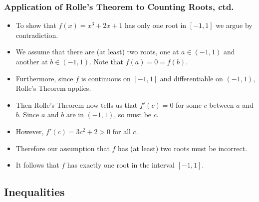 \documentclass[serif,ignorenonframetext]{beamer}
\begin{document}
\begin{frame}
  \frametitle{Application of Rolle's Theorem to Counting Roots, ctd.}
  \begin{itemize}[<+->]
  \item To show that $f(x)=x^3+2x+1$ has only one root in $[-1,1]$
    we argue by contradiction.
  \item We assume that there are (at least) two roots, one at $a\in(-1,1)$ 
    and another at $b\in(-1,1)$.  Note that $f(a)=0=f(b)$.
  \item Furthermore, since $f$ is continuous on $[-1,1]$ and 
    differentiable on $(-1,1)$, Rolle's Theorem applies.
  \item Then Rolle's Theorem now tells us that $f'(c)=0$ for some $c$ 
    between $a$ and $b$.  Since $a$ and $b$ are in $(-1,1)$, so must be $c$.
  \item However, $f'(c)=3c^2+2>0$ for all $c$.
  \item Therefore our assumption that $f$ has (at least)
    two roots must be incorrect.
  \item It follows that $f$ has exactly one root in the interval $[-1,1]$.
  \end{itemize}
\end{frame}


\subsection{Inequalities}
\end{document}
